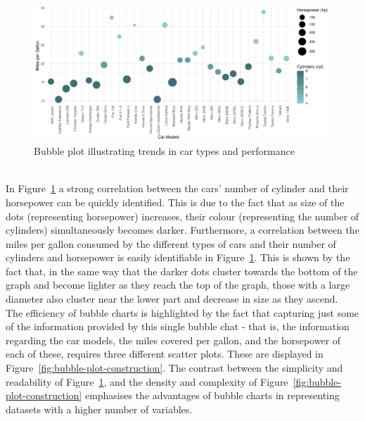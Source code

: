 \documentclass{article}\usepackage[]{graphicx}\usepackage[]{xcolor}
\makeatletter
\def\maxwidth{ %
  \ifdim\Gin@nat@width>\linewidth
    \linewidth
  \else
    \Gin@nat@width
  \fi
}
\newenvironment{knitrout}{}{} %
\numberwithin{equation}{section}
\makeatother
\begin{document}
\begin{knitrout}\scriptsize
{}\color{fgcolor}\begin{figure}[H]

{\centering \includegraphics[width=\maxwidth]{figure/beamer-bubble-plot-1} 

}

\caption[Bubble plot illustrating trends in car types and performance]{Bubble plot illustrating trends in car types and performance}\label{fig:bubble-plot}
\end{figure}

\end{knitrout}

\\\noindent In Figure~\ref{fig:bubble-plot} a strong correlation between the cars' number of cylinder and their horsepower can be quickly identified. This is due to the fact that as size of the dots (representing horsepower) increases, their colour (representing the number of cylinders) simultaneously becomes darker. Furthermore, a correlation between the miles per gallon consumed by the different types of cars and their number of cylinders and horsepower is easily identifiable in Figure~\ref{fig:bubble-plot}. This is shown by the fact that, in the same way that the darker dots cluster towards the bottom of the graph and become lighter as they reach the top of the graph, those with a large diameter also cluster near the lower part and decrease in size as they ascend. \\ 

\noindent 
The efficiency of bubble charts is highlighted by the fact that capturing just some of the information provided by this single bubble chat - that is, the information regarding the car models, the miles covered per gallon, and the horsepower of each of these, requires three different scatter plots. These are displayed in Figure~\ref{fig:bubble-plot-construction}. The contrast between the simplicity and readability of Figure~\ref{fig:bubble-plot}, and the density and complexity of Figure~\ref{fig:bubble-plot-construction} emphasises the advantages of bubble charts in representing datasets with a higher number of variables. 
\end{document}
